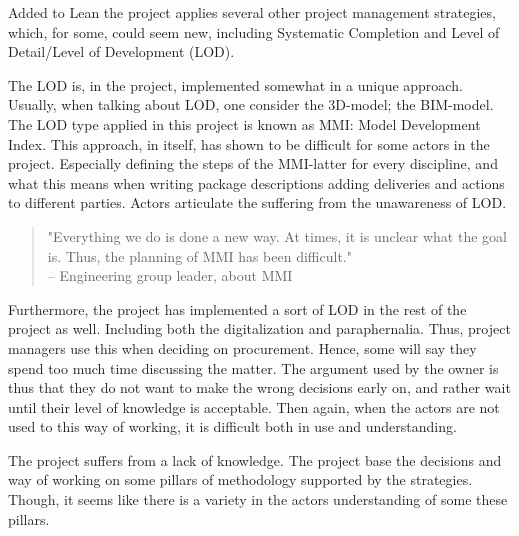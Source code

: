 Added to Lean the project applies several other project management strategies, which, for some, could seem new, including Systematic Completion and Level of Detail/Level of Development (LOD).  

The LOD is, in the project, implemented somewhat in a unique approach. Usually, when talking about LOD, one consider the 3D-model; the BIM-model. The LOD type applied in this project is known as MMI: Model Development Index. This approach, in itself, has shown to be difficult for some actors in the project. Especially defining the steps of the MMI-latter for every discipline, and what this means when writing package descriptions adding deliveries and actions to different parties. Actors articulate the suffering from the unawareness of LOD. 
\begin{quote}
    "Everything we do is done a new way. At times, it is unclear what the goal is. Thus, the planning of MMI has been difficult." \\
    – Engineering group leader, about MMI
\end{quote}
 
Furthermore, the project has implemented a sort of LOD in the rest of the project as well. Including both the digitalization and paraphernalia. Thus, project managers use this when deciding on procurement. Hence, some will say they spend too much time discussing the matter. The argument used by the owner is thus that they do not want to make the wrong decisions early on, and rather wait until their level of knowledge is acceptable. Then again, when the actors are not used to this way of working, it is difficult both in use and understanding.

The project suffers from a lack of knowledge. The project base the decisions and way of working on some pillars of methodology supported by the strategies. Though, it seems like there is a variety in the actors understanding of some these pillars. 
\cleardoublepage